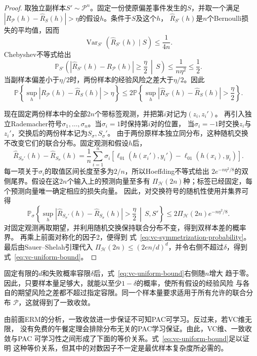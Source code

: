 \begin{proof}
取独立副样本$S'\sim\mathcal P^n$。固定一份使原偏差事件发生的$S$，并取一个满足
$|R_{\mathcal P}(h)-\hat R_S(h)|>\eta$的假设$h$。条件于$S$及这个$h$，
$\hat R_{S'}(h)$是$n$个Bernoulli损失的平均值，因而
\[
 \operatorname{Var}_{S'}\!\left(\hat R_{S'}(h)\mid S\right)
 \leq\frac{1}{4n}.
\]
Chebyshev不等式给出
\[
 \mathbb P_{S'}\left(
   |\hat R_{S'}(h)-R_{\mathcal P}(h)|\geq\frac{\eta}{2}
   \,\middle|\,S
 \right)
 \leq\frac{1}{n\eta^2}\leq\frac12.
\]
当副样本偏差小于$\eta/2$时，两份样本的经验风险之差大于$\eta/2$。因此
\[
 \mathbb P\left\{\sup_h|R_{\mathcal P}(h)-\hat R_S(h)|>\eta\right\}
 \leq
 2\mathbb P\left\{\sup_h|\hat R_{S'}(h)-\hat R_S(h)|>\frac\eta2\right\}.
\]

现在固定两份样本中的全部$2n$个带标签观测，并把第$i$对记为$(z_i,z_i')$。
再引入独立Rademacher符号$\sigma_1,\ldots,\sigma_n$。当$\sigma_i=1$时保持第$i$对的位置，
当$\sigma_i=-1$时交换$z_i$与$z_i'$，交换后的两份样本记为$S_\sigma,S_\sigma'$。
由于两份原样本独立同分布，这种随机交换不改变它们的联合分布。固定观测和假设$h$后，
\[
 \hat R_{S_\sigma'}(h)-\hat R_{S_\sigma}(h)
 =\frac1n\sum_{i=1}^n\sigma_i
 \left[\ell_{01}(h(x_i'),y_i')-\ell_{01}(h(x_i),y_i)\right].
\]
每一项关于$\sigma_i$的取值区间长度至多为$2/n$，所以Hoeffding不等式给出
$2e^{-n\eta^2/8}$的双侧尾界。假设在这$2n$个输入上的预测向量至多有
$\Pi_{\mathcal H}(2n)$种；标签已经固定，每个预测向量唯一确定相应的损失向量。
因此，对交换符号的随机性使用并集界可得
\[
 \mathbb P_\sigma\left\{
   \sup_h|\hat R_{S_\sigma'}(h)-\hat R_{S_\sigma}(h)|>\frac\eta2
   \,\middle|\,S,S'
 \right\}
 \leq2\Pi_{\mathcal H}(2n)e^{-n\eta^2/8}.
\]
对固定观测再取期望，并利用随机交换保持联合分布不变，得到双样本差的概率界。
再乘上前面对称化的因子2，便得到
式~\eqref{eq:vc-symmetrization-probability}。最后由Sauer--Shelah引理代入
$\Pi_{\mathcal H}(2n)\leq(2en/d)^d$，并令右侧不超过$\delta$，得到
式~\eqref{eq:vc-uniform-bound}。
\end{proof}

固定有限的$d$和失败概率容限$\delta$后，式~\eqref{eq:vc-uniform-bound}右侧随$n$增大
趋于零。因此，只要样本量足够大，就能以至少$1-\delta$的概率，使所有假设的经验风险
与各自的期望风险之差都不超过指定容限。同一个样本量要求适用于所有允许的联合分布
$\mathcal P$，这就得到了一致收敛。

由前面ERM的分析，一致收敛进一步保证不可知PAC可学习。反过来，若VC维无限，
没有免费的午餐定理会排除分布无关的PAC学习保证。由此，VC维、一致收敛与PAC
可学习性之间形成了下面的等价关系。式~\eqref{eq:vc-uniform-bound}足以证明
这种等价关系，但其中的对数因子不一定是最优样本复杂度所必需的。

